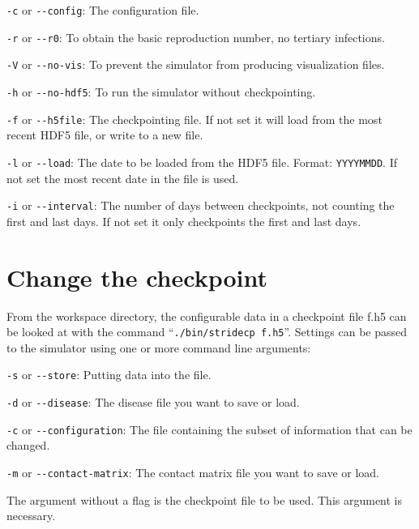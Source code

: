 \begin{compactitem}

\item \texttt{-c} or \texttt{{-}-config}: The configuration file.

\item \texttt{-r} or \texttt{{-}-r0}: To obtain the basic reproduction number, no tertiary infections.

\item \texttt{-V} or \texttt{{-}-no-vis}: To prevent the simulator from producing visualization files.

\item \texttt{-h} or \texttt{{-}-no-hdf5}: To run the simulator without checkpointing.

\item \texttt{-f} or \texttt{{-}-h5file}: The checkpointing file. If not set it will load from the most recent HDF5 file, or write to a new file.

\item \texttt{-l} or \texttt{{-}-load}: The date to be loaded from the HDF5 file. Format: \texttt{YYYYMMDD}. If not set the most recent date in the file is used.

\item \texttt{-i} or \texttt{{-}-interval}: The number of days between checkpoints, not counting the first and last days. If not set it only checkpoints the first and last days.

\end{compactitem}

\section{Change the checkpoint}


From the workspace directory, the configurable data in a checkpoint file f.h5 can be looked at with the command \mbox{``\texttt{./bin/stridecp f.h5}''}. Settings can be passed to the simulator using one or more command line arguments:

\begin{compactitem}

\item \texttt{-s} or \texttt{{-}-store}: Putting data into the file.

\item \texttt{-d} or \texttt{{-}-disease}: The disease file you want to save or load.

\item \texttt{-c} or \texttt{{-}-configuration}: The file containing the subset of information that can be changed.

\item \texttt{-m} or \texttt{{-}-contact-matrix}: The contact matrix file you want to save or load.

\item The argument without a flag is the checkpoint file to be used. This argument is necessary.
\end{compactitem}

